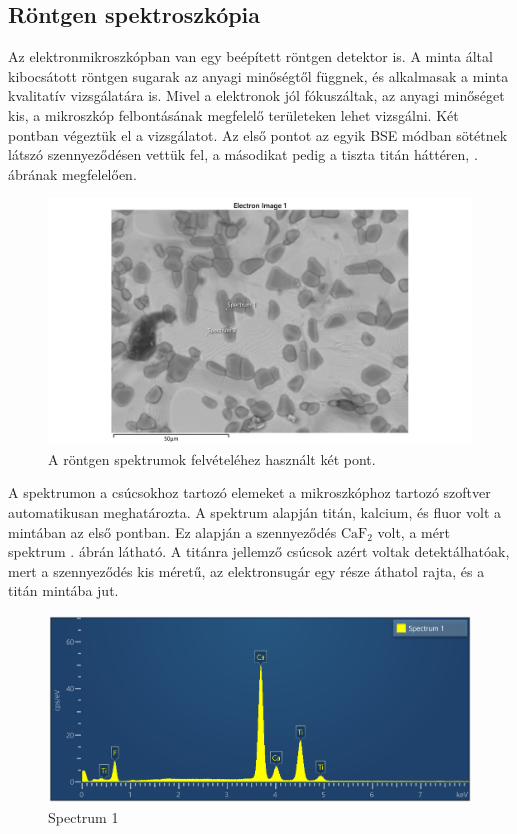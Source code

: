 \documentclass[pdftex,12pt,a4paper]{article}
\begin{document}
		\subsection{Röntgen spektroszkópia}
			Az elektronmikroszkópban van egy beépített röntgen detektor is. A minta által kibocsátott röntgen sugarak az anyagi minőségtől függnek, és alkalmasak a minta kvalitatív vizsgálatára is. Mivel a elektronok jól fókuszáltak, az anyagi minőséget kis, a mikroszkóp felbontásának megfelelő területeken lehet vizsgálni. Két pontban végeztük el a vizsgálatot. Az első pontot az egyik BSE módban sötétnek látszó szennyeződésen vettük fel, a másodikat pedig a tiszta titán háttéren, . ábrának megfelelően.
			\begin{figure}[H]
				\centering
				\includegraphics[scale=0.7]{./figs/spots.png}
				\caption{A röntgen spektrumok felvételéhez használt két pont.}
				\label{spots}
			\end{figure}
			A spektrumon a csúcsokhoz tartozó elemeket a mikroszkóphoz tartozó szoftver automatikusan meghatározta. A spektrum alapján titán, kalcium, és fluor volt a mintában az első pontban. Ez alapján a szennyeződés $\text{CaF}_2$ volt, a mért spektrum . ábrán látható. A titánra jellemző csúcsok azért voltak detektálhatóak, mert a szennyeződés kis méretű, az elektronsugár egy része áthatol rajta, és a titán mintába jut.
			\begin{figure}[H]
				\centering
				\includegraphics[scale=0.7]{./figs/spectrum1.png}
				\caption{Spectrum 1}
				\label{spectrum1}
			\end{figure}
\end{document}
